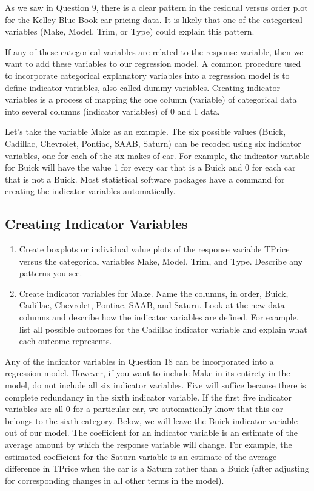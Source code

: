 \documentclass[
]{book}
\begin{document}
As we saw in Question 9, there is a clear pattern in the residual versus order plot for the Kelley Blue Book car pricing data. It is likely that one of the categorical variables (Make, Model, Trim, or Type) could explain this pattern.

If any of these categorical variables are related to the response variable, then we want to add these variables to our regression model. A common procedure used to incorporate categorical explanatory variables into a regression model is to define indicator variables, also called dummy variables. Creating indicator variables is a process of mapping the one column (variable) of categorical data into several columns (indicator variables) of 0 and 1 data.

Let's take the variable Make as an example. The six possible values (Buick, Cadillac, Chevrolet, Pontiac, SAAB, Saturn) can be recoded using six indicator variables, one for each of the six makes of car. For example, the indicator variable for Buick will have the value 1 for every car that is a Buick and 0 for each car that is not a Buick. Most statistical software packages have a command for creating the indicator variables automatically.

\hypertarget{creating-indicator-variables}{%
\subsection*{Creating Indicator Variables}\label{creating-indicator-variables}}

\begin{enumerate}
\def\labelenumi{\arabic{enumi}.}
\setcounter{enumi}{16}
\item
  Create boxplots or individual value plots of the response variable TPrice versus the categorical variables Make, Model, Trim, and Type. Describe any patterns you see.
\item
  Create indicator variables for Make. Name the columns, in order, Buick, Cadillac, Chevrolet, Pontiac, SAAB, and Saturn. Look at the new data columns and describe how the indicator variables are defined. For example, list all possible outcomes for the Cadillac indicator variable and explain what each outcome
  represents.
\end{enumerate}

Any of the indicator variables in Question 18 can be incorporated into a regression model. However, if you want to include Make in its entirety in the model, do not include all six indicator variables. Five will suffice because there is complete redundancy in the sixth indicator variable. If the first five indicator variables are all 0 for a particular car, we automatically know that this car belongs to the sixth category. Below, we will leave the Buick indicator variable out of our model. The coefficient for an indicator variable is an estimate of the average amount by which the response variable will change. For example, the estimated coefficient for the Saturn variable is an estimate of the average difference in TPrice when the car is a Saturn rather than a Buick (after adjusting for corresponding changes in all other terms in the model).
\end{document}
